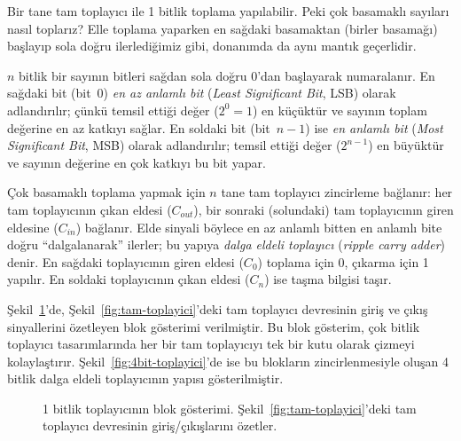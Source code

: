 Bir tane tam toplayıcı ile 1 bitlik toplama yapılabilir. Peki çok basamaklı sayıları nasıl toplarız? Elle toplama yaparken en sağdaki basamaktan (birler basamağı) başlayıp sola doğru ilerlediğimiz gibi, donanımda da aynı mantık geçerlidir.

$n$ bitlik bir sayının bitleri sağdan sola doğru 0'dan başlayarak numaralanır. En sağdaki bit (bit~0) \emph{en az anlamlı bit} (\emph{Least Significant Bit}, LSB) olarak adlandırılır; çünkü temsil ettiği değer ($2^0 = 1$) en küçüktür ve sayının toplam değerine en az katkıyı sağlar. En soldaki bit (bit~$n{-}1$) ise \emph{en anlamlı bit} (\emph{Most Significant Bit}, MSB) olarak adlandırılır; temsil ettiği değer ($2^{n-1}$) en büyüktür ve sayının değerine en çok katkıyı bu bit yapar.

Çok basamaklı toplama yapmak için $n$ tane tam toplayıcı zincirleme bağlanır: her tam toplayıcının çıkan eldesi ($C_{out}$), bir sonraki (solundaki) tam toplayıcının giren eldesine ($C_{in}$) bağlanır. Elde sinyali böylece en az anlamlı bitten en anlamlı bite doğru ``dalgalanarak'' ilerler; bu yapıya \emph{dalga eldeli toplayıcı} (\emph{ripple carry adder}) denir. En sağdaki toplayıcının giren eldesi ($C_0$) toplama için 0, çıkarma için 1 yapılır. En soldaki toplayıcının çıkan eldesi ($C_n$) ise taşma bilgisi taşır.

Şekil~\ref{fig:1bit-toplayici}'de, Şekil~\ref{fig:tam-toplayici}'deki tam toplayıcı devresinin giriş ve çıkış sinyallerini özetleyen blok gösterimi verilmiştir. Bu blok gösterim, çok bitlik toplayıcı tasarımlarında her bir tam toplayıcıyı tek bir kutu olarak çizmeyi kolaylaştırır. Şekil~\ref{fig:4bit-toplayici}'de ise bu blokların zincirlenmesiyle oluşan 4 bitlik dalga eldeli toplayıcının yapısı gösterilmiştir.

\begin{figure}[htbp]
\centering
{}
\caption[1 bitlik toplay{\i}c{\i} (blok g{\"o}sterimi)]{1 bitlik toplayıcının blok gösterimi. Şekil~\ref{fig:tam-toplayici}'deki tam toplayıcı devresinin giriş/çıkışlarını özetler.}
\label{fig:1bit-toplayici}
\end{figure}

